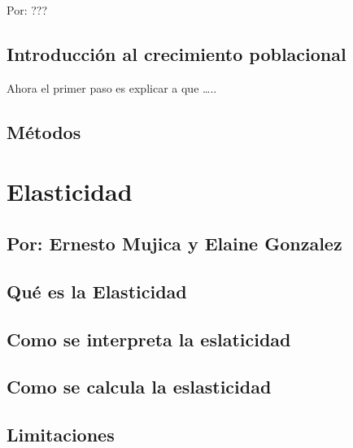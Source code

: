 \documentclass[
]{book}
\theoremstyle{definition}
\theoremstyle{definition}
\theoremstyle{definition}
\theoremstyle{definition}
\theoremstyle{remark}
\begin{document}
Por: ???

\hypertarget{introducciuxf3n-al-crecimiento-poblacional}{%
\section{Introducción al crecimiento poblacional}\label{introducciuxf3n-al-crecimiento-poblacional}}

Ahora el primer paso es explicar a que \ldots..

\hypertarget{muxe9todos}{%
\section{Métodos}\label{muxe9todos}}

\hypertarget{elasticidad}{%
\chapter{Elasticidad}\label{elasticidad}}

\hypertarget{por-ernesto-mujica-y-elaine-gonzalez-1}{%
\section{Por: Ernesto Mujica y Elaine Gonzalez}\label{por-ernesto-mujica-y-elaine-gonzalez-1}}

\hypertarget{quuxe9-es-la-elasticidad}{%
\section{Qué es la Elasticidad}\label{quuxe9-es-la-elasticidad}}

\hypertarget{como-se-interpreta-la-eslaticidad}{%
\section{Como se interpreta la eslaticidad}\label{como-se-interpreta-la-eslaticidad}}

\hypertarget{como-se-calcula-la-eslasticidad}{%
\section{Como se calcula la eslasticidad}\label{como-se-calcula-la-eslasticidad}}

\hypertarget{limitaciones}{%
\section{Limitaciones}\label{limitaciones}}
\end{document}
